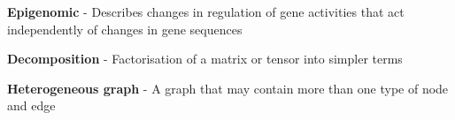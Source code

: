 \begin{mybox}
    \textbf{Epigenomic} - Describes changes in regulation of gene activities that
        act independently of changes in gene sequences
\end{mybox}

\begin{mybox}
    \textbf{Decomposition} - Factorisation of a matrix or tensor into simpler terms
\end{mybox}

\begin{mybox}
    \textbf{Heterogeneous graph} - A graph that may contain more than one type of
        node and edge
\end{mybox}

